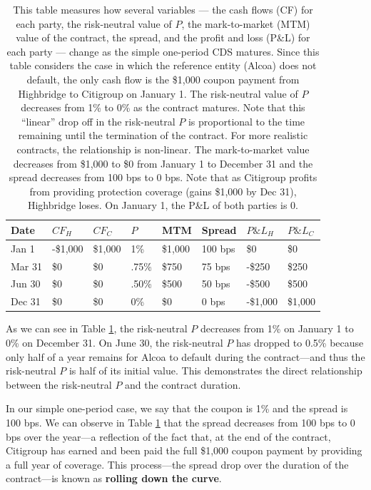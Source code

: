 \documentclass{jss}
\begin{document}
\begin{table}[H]
\centering
{\footnotesize
\begin{tabular}{llllllll}
  \hline
Date & $CF_H$ & $CF_C$ & $P$ & MTM & Spread & $P\&L_H$ & $P\&L_C$ \\ 
  \hline
  Jan 1 & -\$1,000 & \$1,000 & 1\% & \$1,000 & 100 bps & \$0 & \$0 \\ 
  Mar 31 & \$0 & \$0 & .75\% & \$750 & 75 bps & -\$250 & \$250 \\ 
  Jun 30 & \$0 & \$0 & .50\% & \$500 & 50 bps & -\$500 & \$500 \\ 
  Dec 31 & \$0 & \$0 & 0\% & \$0 & 0 bps & -\$1,000 & \$1,000 \\
   \hline
\end{tabular}
}

\caption{This table measures how several variables --- the cash flows (CF) for each party, the risk-neutral value of $P$, the mark-to-market (MTM) value of the contract, the spread, and the profit and loss (P\&L) for each party --- change as the simple one-period CDS matures. Since this table considers the case in which the reference entity (Alcoa) does not default, the only cash flow is the \$1,000 coupon payment from Highbridge to Citigroup on January 1. The risk-neutral value of $P$ decreases from 1\% to 0\% as the contract matures. Note that this ``linear'' drop off in the risk-neutral $P$ is proportional to the time remaining until the termination of the contract. For more realistic contracts, the relationship is non-linear. The mark-to-market value decreases from \$1,000 to \$0 from January 1 to December 31 and the spread decreases from 100 bps to 0 bps. Note that as Citigroup profits from providing protection coverage (gains \$1,000 by Dec 31), Highbridge loses. On January 1, the P\&L of both parties is 0.} 
\label{table.1}
\end{table}

As we can see in Table \ref{table.1}, the risk-neutral $P$ decreases from 1\% on January 1 to 0\% on December 31. On June 30, the risk-neutral $P$ has dropped to 0.5\% because only half of a year remains for Alcoa to default during the contract---and thus the risk-neutral $P$ is half of its initial value. This demonstrates the direct relationship between the risk-neutral $P$ and the contract duration. 

In our simple one-period case, we say that the coupon is 1\% and the spread is 100 bps. We can observe in Table \ref{table.1} that the spread decreases from 100 bps to 0 bps over the year---a reflection of the fact that, at the end of the contract, Citigroup has earned and been paid the full \$1,000 coupon payment by providing a full year of coverage. This process---the spread drop over the duration of the contract---is known as \textbf{rolling down the curve}. 
\end{document}
